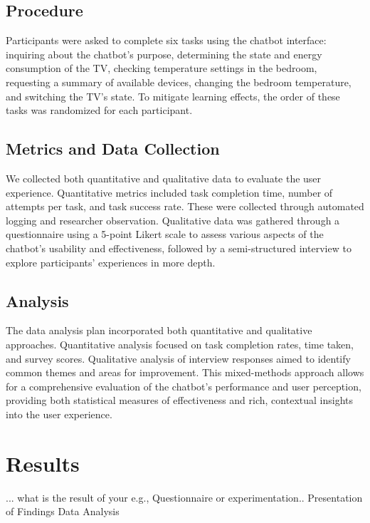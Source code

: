 \subsection{Procedure}
Participants were asked to complete six tasks using the chatbot interface: inquiring about the chatbot's purpose, determining the state and energy consumption of the TV, checking temperature settings in the bedroom, requesting a summary of available devices, changing the bedroom temperature, and switching the TV's state. To mitigate learning effects, the order of these tasks was randomized for each participant.

\subsection{Metrics and Data Collection}
We collected both quantitative and qualitative data to evaluate the user experience. Quantitative metrics included task completion time, number of attempts per task, and task success rate. These were collected through automated logging and researcher observation. Qualitative data was gathered through a questionnaire using a 5-point Likert scale to assess various aspects of the chatbot's usability and effectiveness, followed by a semi-structured interview to explore participants' experiences in more depth.

\subsection{Analysis}
The data analysis plan incorporated both quantitative and qualitative approaches. Quantitative analysis focused on task completion rates, time taken, and survey scores. Qualitative analysis of interview responses aimed to identify common themes and areas for improvement. This mixed-methods approach allows for a comprehensive evaluation of the chatbot's performance and user perception, providing both statistical measures of effectiveness and rich, contextual insights into the user experience.


\section{Results}
... what is the result of your e.g., Questionnaire or experimentation.. 
Presentation of Findings
Data Analysis

%
%
